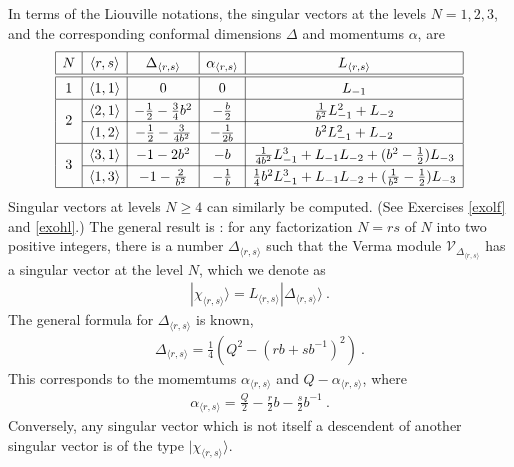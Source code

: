 \documentclass[12pt, a4paper, notitlepage, twoside]{report}
\numberwithin{equation}{section}
\theoremstyle{break}
\begin{document}
In terms of the Liouville notations, the singular vectors at the levels $N=1,2,3$, and the corresponding conformal dimensions $\Delta$ and momentums $\alpha$, are 
\begin{align}
\renewcommand{\arraystretch}{1.3}
\begin{array}{|c|c|c|c|c|}
\hline 
N & \langle r,s\rangle & \Delta_{\langle r,s\rangle} & \alpha_{\langle r,s\rangle} & L_{\langle r,s\rangle} 
\\
\hline\hline
1 & \langle 1,1\rangle & 0 & 0 & L_{-1}
\\
\hline
\multirow{2}{*}{2} & 
\langle 2,1\rangle & -\frac12 -\frac{3}{4} b^2 & -\frac{b}{2} & \frac{1}{b^2}L_{-1}^2 + L_{-2}
\\
\cline{2-5}
& \langle 1,2\rangle & -\frac12 - \frac{3}{4b^2} &  -\frac{1}{2b} & b^2L_{-1}^2 + L_{-2} 
\\
\hline
\multirow{2}{*}{3} &
\langle 3,1 \rangle &  -1 -2 b^2 & -b & \frac{1}{4b^2}L_{-1}^3 + L_{-1}L_{-2}+(b^2-\frac12)L_{-3}
\\
\cline{2-5}
& \langle 1,3 \rangle &  -1 - \frac{2}{b^2} &  -\frac{1}{b} & \frac14 b^2L_{-1}^3 + L_{-1}L_{-2} + (\frac{1}{b^2}-\frac12)L_{-3}
\\
\hline
\end{array}
\label{lot}
\end{align}
Singular vectors at levels $N\geq 4$ can similarly be computed. (See Exercises \ref{exolf} and \ref{exohl}.) The general result is \cite{fms97}: for any factorization $N=rs$ of $N$ into two positive integers, there is a number $\Delta_{\langle r,s \rangle}$ such that the Verma module $\mathcal{V}_{\Delta_{\langle r,s \rangle}}$ has a singular vector at the level $N$, which we denote as
\begin{align}
 |\chi_{\langle r,s \rangle}\rangle = L_{\langle r,s \rangle} |\Delta_{\langle r,s \rangle}\rangle\ .
\label{lrs}
\end{align}
The general formula for $\Delta_{\langle r,s \rangle}$ is known, 
\begin{align}
 \Delta_{\langle r,s \rangle} = \frac14\left(Q^2-(rb+sb^{-1})^2\right)\ .
\label{drs}
\end{align}
This corresponds to the momemtums $\alpha_{\langle r,s \rangle}$ and $Q-\alpha_{\langle r,s \rangle}$, where
\begin{align}
 \boxed{\alpha_{\langle r,s \rangle} = \frac{Q}{2} -\frac{r}{2}b - \frac{s}{2}b^{-1} }\ . 
\label{ars}
\end{align}
Conversely, any singular vector which is not itself a descendent of another singular vector is of the type $|\chi_{\langle r,s \rangle}\rangle$.
\end{document}
